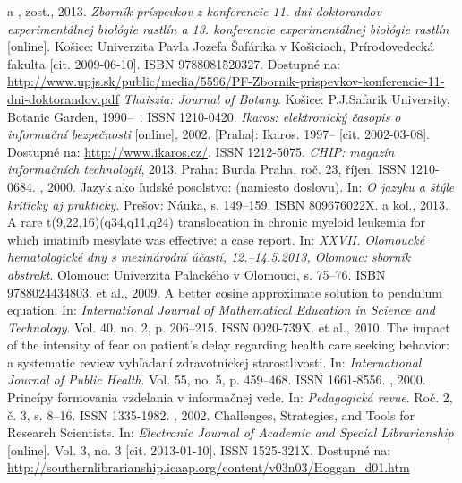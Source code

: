 \documentclass[thesismargins, thesislinespacing, twoside, upjsfrontpage]{rnthesis}
\begin{document}
\begin{thebibliography}{9}
	 a , zost., 2013. \emph{Zborník príspevkov z konferencie 11. dni doktorandov experimentálnej biológie rastlín a 13. konferencie experimentálnej biológie rastlín} [online]. Košice: Univerzita Pavla Jozefa Šafárika v Košiciach, Prírodovedecká fakulta [cit. 2009-06-10]. ISBN 9788081520327. Dostupné na: \url{
http://www.upjs.sk/public/media/5596/PF-Zbornik-prispevkov-konferencie-11-dni-doktorandov.pdf}
%
	\emph{Thaiszia: Journal of Botany}. Košice: P.J.Safarik University, Botanic Garden, \mbox{1990--\ .} ISSN 1210-0420.
	\emph{Ikaros: elektronický časopis o informační bezpečnosti} [online], 2002. [Praha]: Ikaros. 1997--{} [cit. 2002-03-08]. Dostupné na: \url{http://www.ikaros.cz/}. ISSN 1212-5075.
	\emph{CHIP: magazín informačních technologií}, 2013. Praha: Burda Praha, roč. 23, říjen. ISSN 1210-0684.
	, 2000. Jazyk ako ľudské posolstvo: (namiesto doslovu). In: \emph{O jazyku a štýle kriticky aj prakticky}. Prešov: Náuka, s. 149--159. ISBN 809676022X.
	 a kol., 2013. A rare t(9,22,16)(q34,q11,q24) translocation in chronic myeloid leukemia for which imatinib mesylate was effective: a case report. In: \emph{XXVII. Olomoucké hematologické dny s mezinárodní účastí, 12.--14.5.2013, Olomouc: sborník abstrakt}. Olomouc: Univerzita Palackého v Olomouci, s. 75--76. ISBN 9788024434803.
	 et al., 2009. A better cosine approximate solution to pendulum equation. In: \emph{International Journal of Mathematical Education in Science and Technology}. Vol. 40, no. 2, p. 206--215. ISSN 0020-739X.
	 et al., 2010. The impact of the intensity of fear on patient's delay regarding health care seeking behavior: a systematic review vyhľadaní zdravotníckej starostlivosti. In: \emph{International Journal of Public Health}. Vol. 55, no. 5, p. 459--468. ISSN 1661-8556.
	, 2000. Princípy formovania vzdelania v informačnej vede. In: \emph{Pedagogická revue}. Roč. 2, č. 3, s. 8--16. ISSN 1335-1982.
	, 2002. Challenges, Strategies, and Tools for Research Scientists. In: \emph{Electronic Journal of Academic and Special Librarianship} [online]. Vol. 3, no. 3 [cit. 2013-01-10]. ISSN 1525-321X. Dostupné na: \url{http://southernlibrarianship.icaap.org/content/v03n03/Hoggan_d01.htm}

\end{thebibliography}
\end{document}
